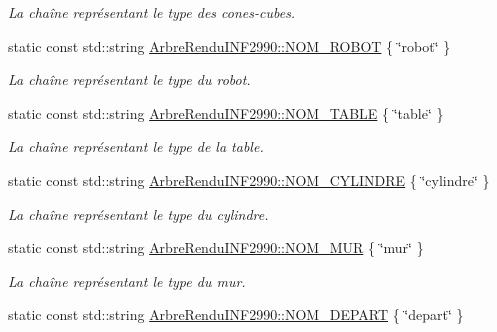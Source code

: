 \begin{DoxyCompactItemize}
\begin{DoxyCompactList}\small\item\em La chaîne représentant le type des cones-\/cubes. \end{DoxyCompactList}\item 
\hypertarget{group__inf2990_ga9a6799aa8903b858929bf675e4468aac}{}static const std\+::string \hyperlink{group__inf2990_ga9a6799aa8903b858929bf675e4468aac}{Arbre\+Rendu\+I\+N\+F2990\+::\+N\+O\+M\+\_\+\+R\+O\+B\+O\+T} \{ \char`\"{}robot\char`\"{} \}\label{group__inf2990_ga9a6799aa8903b858929bf675e4468aac}

\begin{DoxyCompactList}\small\item\em La chaîne représentant le type du robot. \end{DoxyCompactList}\item 
\hypertarget{group__inf2990_ga89e651c1a28481ce70f473bd15555114}{}static const std\+::string \hyperlink{group__inf2990_ga89e651c1a28481ce70f473bd15555114}{Arbre\+Rendu\+I\+N\+F2990\+::\+N\+O\+M\+\_\+\+T\+A\+B\+L\+E} \{ \char`\"{}table\char`\"{} \}\label{group__inf2990_ga89e651c1a28481ce70f473bd15555114}

\begin{DoxyCompactList}\small\item\em La chaîne représentant le type de la table. \end{DoxyCompactList}\item 
\hypertarget{group__inf2990_gae74e1de66e37dee6ef6cb6df82424c0d}{}static const std\+::string \hyperlink{group__inf2990_gae74e1de66e37dee6ef6cb6df82424c0d}{Arbre\+Rendu\+I\+N\+F2990\+::\+N\+O\+M\+\_\+\+C\+Y\+L\+I\+N\+D\+R\+E} \{ \char`\"{}cylindre\char`\"{} \}\label{group__inf2990_gae74e1de66e37dee6ef6cb6df82424c0d}

\begin{DoxyCompactList}\small\item\em La chaîne représentant le type du cylindre. \end{DoxyCompactList}\item 
\hypertarget{group__inf2990_ga4d9c8c9bfa165dde522834dec2882039}{}static const std\+::string \hyperlink{group__inf2990_ga4d9c8c9bfa165dde522834dec2882039}{Arbre\+Rendu\+I\+N\+F2990\+::\+N\+O\+M\+\_\+\+M\+U\+R} \{ \char`\"{}mur\char`\"{} \}\label{group__inf2990_ga4d9c8c9bfa165dde522834dec2882039}

\begin{DoxyCompactList}\small\item\em La chaîne représentant le type du mur. \end{DoxyCompactList}\item 
\hypertarget{group__inf2990_ga7f23ccbd07f9afea9685f108c4053834}{}static const std\+::string \hyperlink{group__inf2990_ga7f23ccbd07f9afea9685f108c4053834}{Arbre\+Rendu\+I\+N\+F2990\+::\+N\+O\+M\+\_\+\+D\+E\+P\+A\+R\+T} \{ \char`\"{}depart\char`\"{} \}\label{group__inf2990_ga7f23ccbd07f9afea9685f108c4053834}


\end{DoxyCompactItemize}
